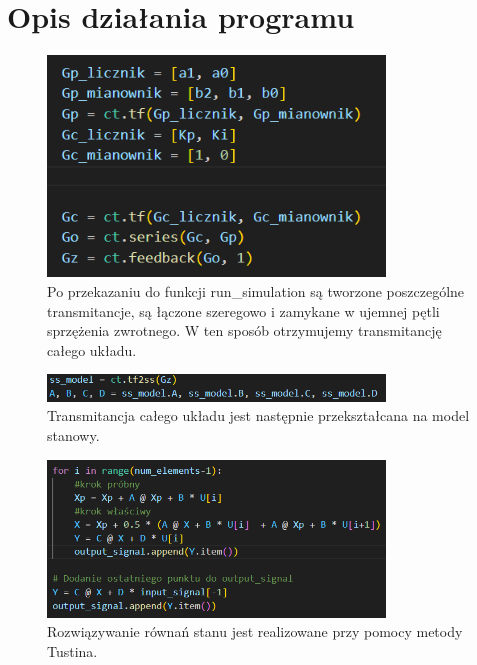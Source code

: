 \documentclass[12pt,a4paper]{article}
\begin{document}
\section{Opis działania programu}
\begin{figure}[h!]
    \centering
    \includegraphics[width=0.8\textwidth]{wykres2.png}
    \caption{Po przekazaniu do funkcji run\_simulation są tworzone poszczególne transmitancje, są łączone szeregowo i zamykane w ujemnej pętli sprzężenia zwrotnego. W ten sposób otrzymujemy transmitancję całego układu.}
\end{figure}

\begin{figure}[h!]
    \centering
    \includegraphics[width=0.8\textwidth]{model.png}
    \caption{Transmitancja całego układu jest następnie przekształcana na model stanowy.}
\end{figure}

\begin{figure}[h!]
    \centering
    \includegraphics[width=0.8\textwidth]{pentla.png}
    \caption{Rozwiązywanie równań stanu jest realizowane przy pomocy metody Tustina.}
\end{figure}
\end{document}
